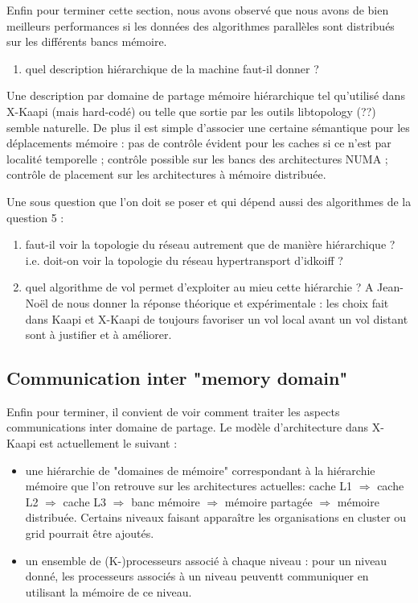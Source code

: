 \documentclass{report}
\begin{document}
Enfin pour terminer cette section, nous avons observé que nous avons de bien meilleurs performances si les données des algorithmes parallèles sont distribués sur les différents bancs mémoire.
\begin{enumerate}[label=\textbf{Q \theenumi.},ref=\textbf{Q \theenumi},resume]
	\item quel description hiérarchique de la machine faut-il donner ?
\end{enumerate}
Une description par domaine de partage mémoire hiérarchique tel qu'utilisé dans X-Kaapi (mais hard-codé) ou telle que sortie par les outils libtopology (??) semble naturelle. De plus il est simple d'associer une certaine sémantique pour les déplacements mémoire : pas de contrôle évident pour les caches si ce n'est par localité temporelle ; contrôle possible sur les bancs des architectures NUMA ; contrôle de placement sur les architectures à mémoire distribuée.

Une sous question que l'on doit se poser et qui dépend aussi des algorithmes de la question 5 : 
\begin{enumerate}[label=\textbf{Q \theenumi.},ref=\textbf{Q \theenumi},resume]
	\item faut-il voir la topologie du réseau autrement que de manière hiérarchique ? i.e. doit-on voir la topologie du réseau hypertransport d'idkoiff ?

	\item quel algorithme de vol permet d'exploiter au mieu cette hiérarchie ?
A Jean-Noël de nous donner la réponse théorique et expérimentale : les choix fait dans Kaapi et X-Kaapi de toujours favoriser un vol local avant un vol distant sont à justifier et à améliorer.
\end{enumerate}




\subsection{Communication inter "memory domain"}
Enfin pour terminer, il convient de voir comment traiter les aspects communications inter domaine de partage.
Le modèle d'architecture dans X-Kaapi est actuellement le suivant :
\begin{itemize}
	\item une hiérarchie de "domaines de mémoire" correspondant à la hiérarchie mémoire que l'on retrouve sur les architectures actuelles: cache L1 $\Rightarrow$ cache L2 $\Rightarrow$ cache L3 $\Rightarrow$ banc mémoire $\Rightarrow$ mémoire partagée $\Rightarrow$ mémoire distribuée. Certains niveaux faisant apparaître les organisations en cluster ou grid pourrait être ajoutés.
	\item un ensemble de (K-)processeurs associé à chaque niveau : pour un niveau donné,  les processeurs associés à un niveau peuventt communiquer en utilisant la mémoire de ce niveau.
\end{itemize}
\end{document}
